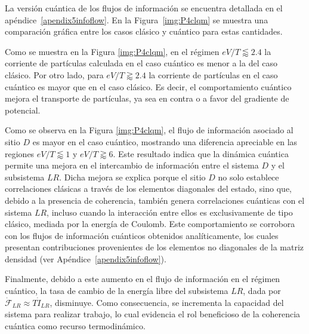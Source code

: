 La versión cuántica de los flujos de información se encuentra detallada en el apéndice~\ref{apendix5infoflow}. En la Figura~\ref{img:P4clqm} se muestra una comparación gráfica entre los casos clásico y cuántico para estas cantidades.


Como se muestra en la Figura \ref{img:P4clqm}, en el régimen $eV/T\lessapprox 2.4$ la corriente de partículas calculada en el caso cuántico es menor a la del caso clásico. Por otro lado, para $eV/T \gtrapprox 2.4$ la corriente de partículas en el caso cuántico es mayor que en el caso clásico. Es decir, el comportamiento cuántico mejora el transporte de partículas, ya sea en contra o a favor del gradiente de potencial. 

Como se observa en la Figura \ref{img:P4clqm}, el flujo de información asociado al sitio $D$ es mayor en el caso cuántico, mostrando una diferencia apreciable en las regiones $eV/T \lessapprox 1$ y $eV/T \gtrapprox 6$. Este resultado indica que la dinámica cuántica permite una mejora en el intercambio de información entre el sistema $D$ y el subsistema $LR$. Dicha mejora se explica porque el sitio $D$ no solo establece correlaciones clásicas a través de los elementos diagonales del estado, sino que, debido a la presencia de coherencia, también genera correlaciones cuánticas con el sistema $LR$, incluso cuando la interacción entre ellos es exclusivamente de tipo clásico, mediada por la energía de Coulomb. Este comportamiento se corrobora con los flujos de información cuánticos obtenidos analíticamente, los cuales presentan contribuciones provenientes de los elementos no diagonales de la matriz densidad (ver Apéndice~\ref{apendix5infoflow}).
 

Finalmente, debido a este aumento en el flujo de información en el régimen cuántico, la tasa de cambio de la energía libre del subsistema $LR$, dada por $\dot{\mathcal{F}}_{LR} \approx T\dot{I}_{LR}$, disminuye. Como consecuencia, se incrementa la capacidad del sistema para realizar trabajo, lo cual evidencia el rol beneficioso de la coherencia cuántica como recurso termodinámico.


\label{sec5:demonio}


